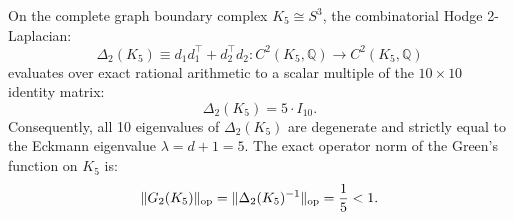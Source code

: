 \begin{theorem}
\label{thm:k5_exact_laplacian}
On the complete graph boundary complex $K_5 \cong S^3$, the combinatorial Hodge 2-Laplacian:
\begin{equation}
\label{eq:delta2_k5_operator}
\Delta_2(K_5) \equiv d_1 d_1^\top + d_2^\top d_2 : C^2(K_5, \mathbb{Q}) \longrightarrow C^2(K_5, \mathbb{Q})
\end{equation}
evaluates over exact rational arithmetic to a scalar multiple of the $10 \times 10$ identity matrix:
\begin{equation}
\label{eq:delta2_k5_identity}
\Delta_2(K_5) = 5 \cdot I_{10}.
\end{equation}
Consequently, all 10 eigenvalues of $\Delta_2(K_5)$ are degenerate and strictly equal to the Eckmann eigenvalue $\lambda = d + 1 = 5$. The exact operator norm of the Green's function on $K_5$ is:
\begin{equation}
\label{eq:k5_greens_norm}
\|G_2(K_5)\|_{\mathrm{op}} = \|\Delta_2(K_5)^{-1}\|_{\mathrm{op}} = \frac{1}{5} < 1.
\end{equation}
\end{theorem}

